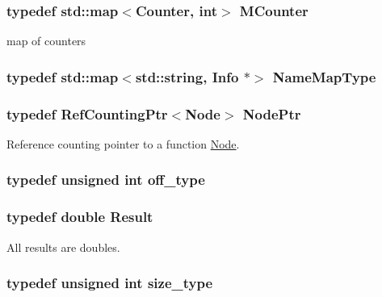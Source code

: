 \hypertarget{namespaceStats_a5a8433a643d3c7f0692fd273dcbe6423}{
\subsubsection[{MCounter}]{\setlength{\rightskip}{0pt plus 5cm}typedef std::map$<${\bf Counter}, int$>$ {\bf MCounter}}}
\label{namespaceStats_a5a8433a643d3c7f0692fd273dcbe6423}
map of counters \hypertarget{namespaceStats_a45a78e2268e9f18065a10879d43f0db4}{
\subsubsection[{NameMapType}]{\setlength{\rightskip}{0pt plus 5cm}typedef std::map$<$std::string, {\bf Info} $\ast$$>$ {\bf NameMapType}}}
\label{namespaceStats_a45a78e2268e9f18065a10879d43f0db4}
\hypertarget{namespaceStats_aa88307dbf1a45aa2d5760fbfe45e2000}{
\subsubsection[{NodePtr}]{\setlength{\rightskip}{0pt plus 5cm}typedef {\bf RefCountingPtr}$<${\bf Node}$>$ {\bf NodePtr}}}
\label{namespaceStats_aa88307dbf1a45aa2d5760fbfe45e2000}
Reference counting pointer to a function \hyperlink{classStats_1_1Node}{Node}. \hypertarget{namespaceStats_a2773c9fa9e4b0b04a46b37494b44842a}{
\subsubsection[{off\_\-type}]{\setlength{\rightskip}{0pt plus 5cm}typedef unsigned int {\bf off\_\-type}}}
\label{namespaceStats_a2773c9fa9e4b0b04a46b37494b44842a}
\hypertarget{namespaceStats_ad874d2cfd4b4a29ebd480bb2e67f20ae}{
\subsubsection[{Result}]{\setlength{\rightskip}{0pt plus 5cm}typedef double {\bf Result}}}
\label{namespaceStats_ad874d2cfd4b4a29ebd480bb2e67f20ae}
All results are doubles. \hypertarget{namespaceStats_ada51e68d31936547d3729c82daf6b7c6}{
\subsubsection[{size\_\-type}]{\setlength{\rightskip}{0pt plus 5cm}typedef unsigned int {\bf size\_\-type}}}
